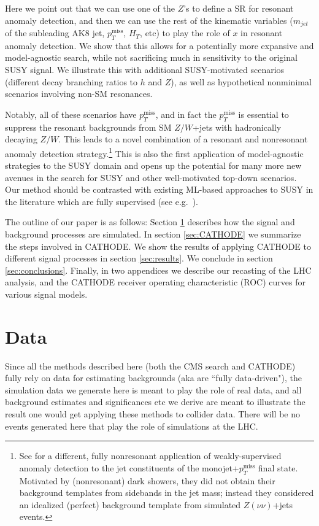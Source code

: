\documentclass[prd, twocolumn, superscriptaddress,floatfix, nofootinbib, preprintnumbers]{revtex4-2}
\begin{document}
Here we point out that we can use one of the $Z$'s to define a SR for resonant anomaly detection, and then we can use the rest of the kinematic variables ($m_{jet}$ of the subleading AK8 jet, $p_T^\text{miss}$, $H_T$, etc) to play the role of $x$ in resonant anomaly detection. We show that this allows for a potentially more expansive and model-agnostic search, while not sacrificing much in sensitivity to the original SUSY signal. We illustrate this with additional SUSY-motivated scenarios (different decay branching ratios to $h$ and $Z$), as well as hypothetical nonminimal scenarios involving non-SM resonances. 

Notably, all of these scenarios have $p_T^\text{miss}$, and in fact the $p_T^\text{miss}$ is essential to suppress the resonant backgrounds from SM $Z/W$+jets with hadronically decaying $Z/W$. This leads to a novel combination of a resonant and nonresonant anomaly detection strategy.\footnote{See \cite{Finke:2022lsu} for a different, fully nonresonant application of weakly-supervised anomaly detection to the jet constituents of the monojet+$p_T^\text{miss}$ final state. Motivated by (nonresonant) dark showers, they did not obtain their background templates from sidebands in the jet mass; instead they considered an idealized (perfect) background template from simulated $Z(\nu\nu)$+jets events.}
This is also the first application of model-agnostic strategies to the SUSY domain and opens up the potential for many more new avenues in the search for SUSY and other well-motivated top-down scenarios. Our method should be contrasted with existing ML-based approaches to SUSY in the literature which are fully supervised (see e.g.\ 
\cite{Mullin:2019mmh,CMS-PAS-SUS-21-006,ATLAS:2022ihe,CMS:2023ktc,Choudhury:2023eje}). 


The outline of our paper is as follows: Section \ref{sec:data} describes how the signal and background processes are simulated. In section \ref{sec:CATHODE} we summarize the steps involved in CATHODE. We show the results of applying CATHODE to different signal processes in section \ref{sec:results}. We conclude in section \ref{sec:conclusions}.
Finally, in two appendices we describe our recasting of the LHC analysis, and the CATHODE receiver operating characteristic (ROC) curves for various signal models.
\section{Data}
\label{sec:data}

Since all the methods described here (both the CMS search and CATHODE) fully rely on data for estimating backgrounds (aka are ``fully data-driven"), the simulation data we generate here is meant to play the role of real data, and all background estimates and significances etc we derive are meant to illustrate the result one would get applying these methods to collider data. There will be no events generated here that play the role of simulations at the LHC.
\end{document}

